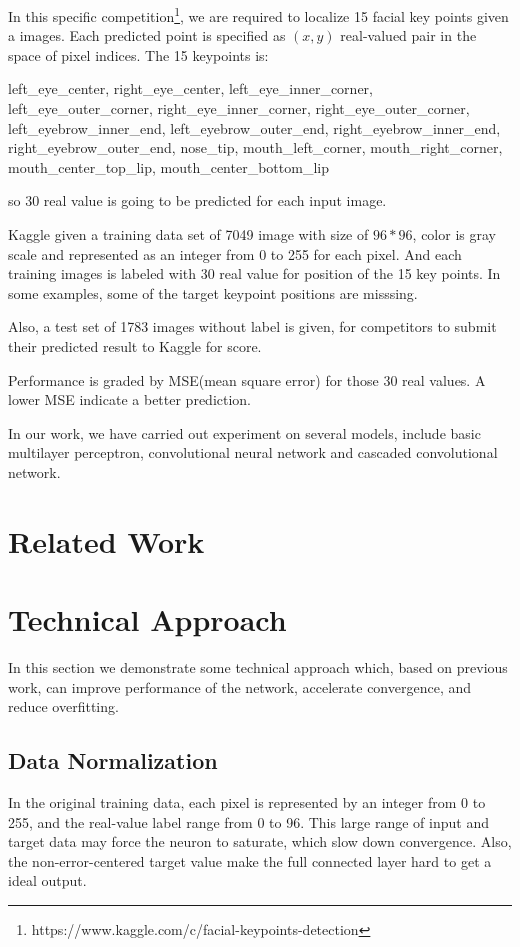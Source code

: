\documentclass[10pt,twocolumn,letterpaper]{article}
\begin{document}
In this specific competition\footnote{https://www.kaggle.com/c/facial-keypoints-detection}, 
we are required to localize 15 facial key points given a images. Each predicted point
is specified as $(x,y)$ real-valued pair in the space of pixel indices.
The 15 keypoints is: 

left\_eye\_center, right\_eye\_center, left\_eye\_inner\_corner, left\_eye\_outer\_corner, right\_eye\_inner\_corner, right\_eye\_outer\_corner, left\_eyebrow\_inner\_end, left\_eyebrow\_outer\_end, right\_eyebrow\_inner\_end, right\_eyebrow\_outer\_end, nose\_tip, mouth\_left\_corner, mouth\_right\_corner, mouth\_center\_top\_lip, mouth\_center\_bottom\_lip

so 30 real value is going to be predicted for each input image.

Kaggle given a training data set of 7049 image with size of $96*96$,
color is gray scale and represented as an integer from 0 to 255 for each
pixel. And each training images is labeled with 30 real value for position of the 
15 key points. In some examples, some of the target keypoint positions are misssing.

Also, a test set of 1783 images without label is given, for competitors to submit their
predicted result to Kaggle for score.

Performance is graded by MSE(mean square error) for those 30 real values. A lower
MSE indicate a better prediction.

In our work, we have carried out experiment on several models, include basic multilayer
perceptron, convolutional neural network and cascaded convolutional network.


\section{Related Work}

\section{Technical Approach}
In this section we demonstrate some technical approach which, based on previous
work, can improve performance of the network, accelerate convergence, and reduce
overfitting.

\subsection{Data Normalization}
In the original training data, each pixel is represented by an integer from 0 to 255,
and the real-value label range from 0 to 96. This large range of input and target data
may force the neuron to saturate, which slow down convergence. Also, the non-error-centered
target value make the full connected layer hard to get a ideal output.
\end{document}
